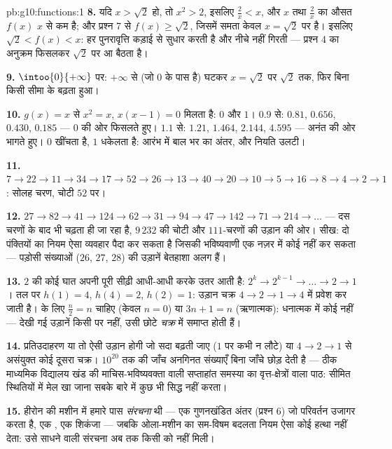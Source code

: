\begin{solution}{pb:g10:functions:1}
\textbf{8.} यदि $x > \sqrt2$ हो, तो $x^2 > 2$, इसलिए $\frac2x < x$, और $x$ तथा $\frac2x$ का औसत
$f(x)$ $x$ से कम है; और प्रश्न 7 से $f(x) \geq \sqrt2$, जिसमें समता केवल $x = \sqrt2$ पर है।
इसलिए $\sqrt2 < f(x) < x$: हर पुनरावृत्ति कड़ाई से सुधार करती है और नीचे नहीं गिरती ---
प्रश्न 4 का अनुक्रम फिसलकर $\sqrt2$ पर आ बैठता है।

\textbf{9.} $\intoo{0}{+\infty}$ पर: $+\infty$ से (जो $0$ के पास है) घटकर $x = \sqrt2$ पर 
$\sqrt2$ तक, फिर बिना किसी सीमा के बढ़ता हुआ।

\textbf{10.} $g(x) = x$ से $x^2 = x$, $x(x - 1) = 0$ मिलता है:  $0$ और $1$।
$0.9$ से: $0.81$, $0.656$, $0.430$, $0.185$ --- $0$ की ओर फिसलते हुए। $1.1$ से:
$1.21$, $1.464$, $2.144$, $4.595$ --- अनंत की ओर भागते हुए।  $0$
खींचता है, $1$ धकेलता है: आरंभ में बाल भर का अंतर, और नियति उलटी।

\textbf{11.} $7 \to 22 \to 11 \to 34 \to 17 \to 52 \to 26 \to
13 \to 40 \to 20 \to 10 \to 5 \to 16 \to 8 \to 4 \to 2 \to 1$: सोलह चरण, चोटी $52$ पर।

\textbf{12.} $27 \to 82 \to 41 \to 124 \to 62 \to 31 \to 94 \to
47 \to 142 \to 71 \to 214 \to \dots$ --- दस चरणों के बाद भी चढ़ता ही जा रहा है, $9\,232$ की चोटी
और $111$-चरणों की उड़ान की ओर। सीख: दो पंक्तियों का नियम ऐसा व्यवहार पैदा
कर सकता है जिसकी भविष्यवाणी एक नज़र में कोई नहीं कर सकता --- पड़ोसी संख्याओं
($26$, $27$, $28$) की उड़ानें बेतहाशा अलग हैं।

\textbf{13.} $2$ की कोई घात अपनी पूरी सीढ़ी आधी-आधी करके उतर आती है:
$2^k \to 2^{k-1} \to \dots \to 2 \to 1$। तल पर $h(1) = 4$, $h(4) = 2$, $h(2) = 1$: उड़ान चक्र $4 \to 2 \to 1 \to 4$ में प्रवेश कर जाती है।
 के लिए $\frac n2 = n$ चाहिए (केवल $n = 0$) या $3n + 1 = n$ (ऋणात्मक): धनात्मक
 में कोई नहीं --- देखी गई उड़ानें किसी  पर नहीं, उसी
छोटे \emph{चक्र} में समाप्त होती हैं।

\textbf{14.} प्रतिउदाहरण या तो ऐसी उड़ान होगी जो सदा बढ़ती जाए ($1$ पर
कभी न लौटे) या $4 \to 2 \to 1$ से असंयुक्त कोई दूसरा चक्र। $10^{20}$ तक की जाँच अनगिनत
संख्याएँ बिना जाँचे छोड़ देती है --- ठीक माध्यमिक विद्यालय खंड की
माचिस-भविष्यवक्ता वाली सप्ताहांत समस्या का वृत्त-क्षेत्रों वाला पाठ: सीमित
स्थितियों में मेल खा जाना सबके बारे में कुछ भी सिद्ध नहीं करता।

\textbf{15.} हीरोन की मशीन में हमारे पास \emph{संरचना} थी --- एक गुणनखंडित
अंतर (प्रश्न 6) जो परिवर्तन उजागर करता है, एक , एक शिकंजा --- जबकि
ओला-मशीन का सम-विषम बदलता नियम ऐसा कोई हत्था नहीं देता: उसे साधने वाली
संरचना अब तक किसी को नहीं मिली।


\end{solution}
